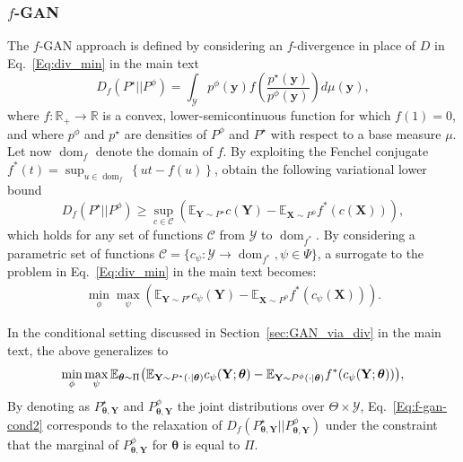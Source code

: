 \documentclass[twoside,11pt]{article}
\newcommand{\E}{\mathbb{E}}
\newcommand{\R}{\mathbb{R}}
\newcommand{\Y}{\mathcal{Y}}
\newcommand{\ddtheta}{\boldsymbol{\theta}}
\newcommand{\ddobs}{\mathbf{y}}
\newcommand{\Ddsim}{\mathbf{X}}
\newcommand{\Ddobs}{\mathbf{Y}}
\begin{document}
	\subsubsection{$ f $-GAN}\label{app:f-GAN}
	The $ f $-GAN approach is defined by considering an $ f $-divergence in place of $ D $ in Eq.~\eqref{Eq:div_min} in the main text
	\begin{equation}\label{key}
	D_f(P^\star||P^\phi) = \int_{\mathcal{Y}} p^\phi(\ddobs) f\left(\frac{p^\star(\ddobs)}{p^\phi(\ddobs)}\right)d\mu(\ddobs),
	\end{equation}
	where $ f:\mathbb{R}_+\to \R $  is a convex, lower-semicontinuous function for which $ f(1)=0 $, and where $ p^\phi $ and $ p^\star $ are densities of $ P^\phi $ and $ P^\star $ with respect to a base measure $ \mu $. Let now $ \operatorname{dom}_f $ denote the domain of $ f $. By exploiting the Fenchel conjugate $ f^*(t) = \sup_{u \in \operatorname{dom}_f } \left\{ut - f(u)\right\}$, \cite{nowozin2016f} obtain the following variational lower bound
	\begin{equation}\label{}
	D_f(P^\star||P^\phi)	\ge \sup_{c \in \mathcal{C}} \left(\mathbb{E}_{\Ddobs \sim P^\star}c(\Ddobs)-\mathbb{E}_{\Ddsim \sim P^\phi}f^{*}(c(\Ddsim))\right),
	\end{equation}
	which holds for any set of functions $ \mathcal{C} $ from $\Y $ to $ \operatorname{dom}_{f^*}$.
	By considering a parametric set of functions $ \mathcal{C} =\{ c_\psi:\mathcal{Y} \to  \operatorname{dom}_{f^*}, \psi \in \Psi\} $, a surrogate to the problem in Eq.~\eqref{Eq:div_min} in the main text becomes:
	\begin{eqnarray}\label{}
	\min_\phi \max_\psi  \left(\mathbb{E}_{\Ddobs \sim P^\star}c_\psi(\Ddobs)-\mathbb{E}_{\Ddsim \sim P^\phi}f^{*}(c_\psi(\Ddsim))\right).
	\end{eqnarray}
	
	In the conditional setting discussed in Section~\ref{sec:GAN_via_div} in the main text, the above generalizes to
	\begin{equation}\label{Eq:f-gan-cond2}
	\min_\phi \max_\psi  \E_{ \ddtheta \sim \Pi}\big(\mathbb{E}_{\Ddobs \sim P^\star(\cdot|\ddtheta)}c_\psi(\Ddobs; \ddtheta)\\
	-\mathbb{E}_{\Ddobs \sim P^\phi(\cdot|\ddtheta)}f^{*}(c_\psi(\Ddobs;\ddtheta))\big),
	\end{equation}
	By denoting as $ P_{\ddtheta, \Ddobs}^\star$ and $P_{\ddtheta, \Ddobs}^\phi $ the joint distributions over $ \Theta\times\Y $, Eq.~\eqref{Eq:f-gan-cond2} corresponds to the relaxation of $ D_f(P_{\ddtheta, \Ddobs}^\star||P_{\ddtheta, \Ddobs}^\phi) $ under the constraint that the marginal of $ P_{\ddtheta, \Ddobs}^\phi $ for $ \ddtheta $ is equal to $ \Pi $.
	
\end{document}
